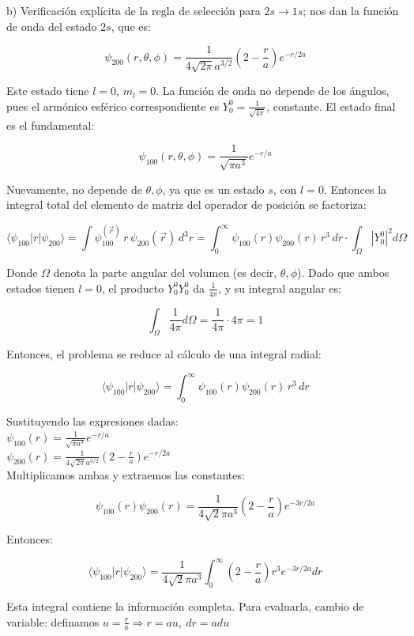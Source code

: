 \documentclass{article}
\theoremstyle{nonumberplain}
\begin{document}
b) Verificación explícita de la regla de selección para $2s \to 1s$; nos dan la función de onda del estado $2s$, que es:

$$
\psi_{200}(r, \theta, \phi) = \frac{1}{4\sqrt{2\pi} a^{3/2}} \left(2 - \frac{r}{a}\right) e^{-r/2a}
$$

Este estado tiene $l = 0$, $m_l = 0$. La función de onda no depende de los ángulos, pues el armónico esférico correspondiente es $Y_0^0 = \frac{1}{\sqrt{4\pi}}$, constante. El estado final es el fundamental:

$$
\psi_{100}(r, \theta, \phi) = \frac{1}{\sqrt{\pi a^3}} e^{-r/a}
$$

Nuevamente, no depende de $\theta, \phi$, ya que es un estado $s$, con $l = 0$. Entonces la integral total del elemento de matriz del operador de posición se factoriza:

$$
\langle \psi_{100} | r | \psi_{200} \rangle = \int \psi_{100}^(\vec{r})\, r\, \psi_{200}(\vec{r})\, d^3r = \int_0^\infty \psi_{100}(r) \psi_{200}(r)\, r^3\, dr \cdot \int_{\Omega} |Y_0^0|^2 d\Omega
$$

Donde $\Omega$ denota la parte angular del volumen (es decir, $\theta, \phi$). Dado que ambos estados tienen $l=0$, el producto $Y_0^0 Y_0^0$ da $\frac{1}{4\pi}$, y su integral angular es:

$$
\int_{\Omega} \frac{1}{4\pi} d\Omega = \frac{1}{4\pi} \cdot 4\pi = 1
$$

Entonces, el problema se reduce al cálculo de una integral radial:

$$
\langle \psi_{100} | r | \psi_{200} \rangle = \int_0^\infty \psi_{100}(r) \psi_{200}(r)\, r^3\, dr
$$

Sustituyendo las expresiones dadas: \\

 $\psi_{100}(r) = \frac{1}{\sqrt{\pi a^3}} e^{-r/a}$ \\
 $\psi_{200}(r) = \frac{1}{4\sqrt{2\pi} a^{3/2}} \left(2 - \frac{r}{a} \right) e^{-r/2a}$ \\

Multiplicamos ambas y extraemos las constantes:

$$
\psi_{100}(r)\psi_{200}(r) = \frac{1}{4\sqrt{2}\pi a^3} \left(2 - \frac{r}{a} \right) e^{-3r/2a}
$$

Entonces:

$$
\langle \psi_{100} | r | \psi_{200} \rangle = \frac{1}{4\sqrt{2} \pi a^3} \int_0^\infty \left(2 - \frac{r}{a} \right) r^3 e^{-3r/2a} dr
$$

Esta integral contiene la información completa. Para evaluarla, cambio de variable: definamos $u = \frac{r}{a} \Rightarrow r = au,\ dr = a du$ \\
\end{document}

